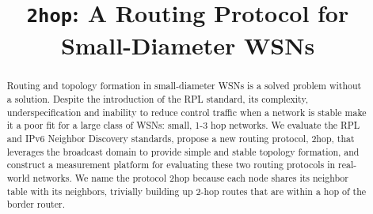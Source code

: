 \documentclass[conference]{IEEEtran}
\begin{document}
\title{\texttt{2hop}: A Routing Protocol for Small-Diameter WSNs}

\author{
\and
{}
}

\maketitle

\begin{abstract}
Routing and topology formation in small-diameter WSNs is a solved problem without a solution.
Despite the introduction of the RPL standard, its complexity, underspecification and inability to reduce control traffic when a network is stable make it a poor fit for a large class of WSNs: small, 1-3 hop networks.
We evaluate the RPL and IPv6 Neighbor Discovery standards, propose a new routing protocol, 2hop, that leverages the broadcast domain to provide simple and stable topology formation, and construct a measurement platform for evaluating these two routing protocols in real-world networks.
We name the protocol 2hop because each node shares its neighbor table with its neighbors, trivially building up 2-hop routes that are within a hop of the border router.
\end{abstract}

















\end{document}

